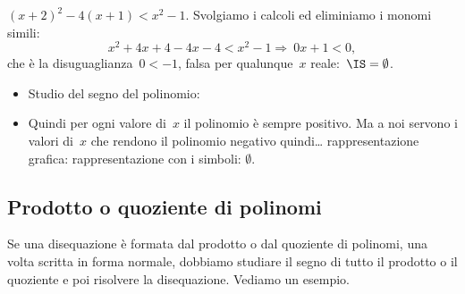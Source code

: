\begin{esempio}{}{}
\((x+2)^2-4(x+1)<x^{2}-1.\)
Svolgiamo i calcoli ed eliminiamo i monomi simili:
\[x^{2}+4x+4-4x-4<x^{2}-1\Rightarrow~0 x + 1 < 0,\]
che è la disuguaglianza~\(0<-1\), falsa per qualunque~\(x\)
reale:~\(\IS=\emptyset \).
\begin{itemize} [noitemsep]
 \item Studio del segno del polinomio:\\
\hspace*{-5mm} 
\item Quindi per ogni valore di~\(x\) il polinomio è sempre positivo. 
Ma a noi servono i valori di~\(x\) che rendono il polinomio negativo 
quindi\dots
\subitem rappresentazione grafica: 
\subitem rappresentazione con i simboli: \quad \(\emptyset\). 
\end{itemize}
\end{esempio}

\subsection{Prodotto o quoziente di polinomi}
\label{sec:dis_prod_quo}
 
Se una disequazione è formata dal prodotto o dal quoziente di polinomi, 
una volta scritta in forma normale,
dobbiamo studiare il segno di tutto il prodotto o il quoziente e poi 
risolvere la disequazione.
Vediamo un esempio.


